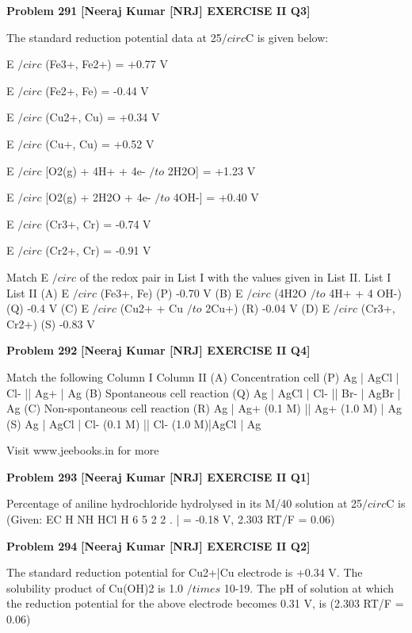 \begin{problembox}
\textbf{Problem 291} \hfill \textbf{[Neeraj Kumar [NRJ] EXERCISE II Q3]}
\label{q:ext-nrj_all_questions-291}

The standard reduction potential data at 25$/circ$C is 
given below:
 
 E $/circ$ (Fe3+, Fe2+) = +0.77 V
 
 E $/circ$ (Fe2+, Fe) = -0.44 V
 
 E $/circ$ (Cu2+, Cu) = +0.34 V
 
 E $/circ$ (Cu+, Cu) = +0.52 V
 
 E $/circ$ [O2(g) + 4H+ + 4e- $/to$ 2H2O] = +1.23 V
 
 E $/circ$ [O2(g) + 2H2O + 4e- $/to$ 4OH-] = +0.40 V
 
 E $/circ$ (Cr3+, Cr) = -0.74 V
 
 E $/circ$ (Cr2+, Cr) = -0.91 V
 
 Match E $/circ$ of the redox pair in List I with the values 
given in List II.
List I
List II
(A)  E $/circ$ (Fe3+, Fe)
(P)  -0.70 V
(B)  E $/circ$ (4H2O $/to$ 4H+ + 4 OH-)
(Q)  -0.4 V
(C)  E $/circ$ (Cu2+ + Cu $/to$ 2Cu+)
(R)  -0.04 V
(D)  E $/circ$ (Cr3+, Cr2+)
(S)  -0.83 V
\end{problembox}

\begin{problembox}
\textbf{Problem 292} \hfill \textbf{[Neeraj Kumar [NRJ] EXERCISE II Q4]}
\label{q:ext-nrj_all_questions-292}

Match the following
Column I
Column II
(A)  Concentration cell (P)  Ag | AgCl | Cl- || Ag+ | Ag
(B)  Spontaneous cell 
reaction
(Q)  Ag | AgCl | Cl- || Br- | 
AgBr | Ag
(C)  Non-spontaneous 
cell reaction
(R)  Ag | Ag+ (0.1 M) || Ag+ 
(1.0 M) | Ag
(S)  Ag | AgCl | Cl- (0.1 M) || Cl-
(1.0 M)|AgCl | Ag
 
 
Visit www.jeebooks.in for more
\end{problembox}

\begin{problembox}
\textbf{Problem 293} \hfill \textbf{[Neeraj Kumar [NRJ] EXERCISE II Q1]}
\label{q:ext-nrj_all_questions-293}

Percentage of aniline hydrochloride hydrolysed in 
its M/40 solution at 25$/circ$C is (Given: EC H NH
HCl H
6
5
2
2
.
|
= -0.18   V, 2.303 RT/F = 0.06)
\end{problembox}

\begin{problembox}
\textbf{Problem 294} \hfill \textbf{[Neeraj Kumar [NRJ] EXERCISE II Q2]}
\label{q:ext-nrj_all_questions-294}

The standard reduction potential for Cu2+|Cu 
electrode is +0.34 V. The solubility product of 
Cu(OH)2 is 1.0 $/times$ 10-19. The pH of solution at 
which the reduction potential for the above 
electrode becomes 0.31 V, is (2.303 RT/F = 0.06)
\end{problembox}

